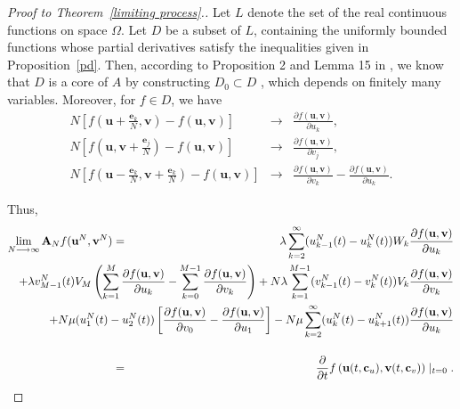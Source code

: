 \documentclass[12pt]{article}
\begin{document}
\begin{proof}[\textit{Proof to Theorem~\ref{limiting process}.}]
 Let $L$ denote the set of the real continuous functions on space $\Omega$. Let $D$ be a subset of $L$, containing the uniformly bounded functions whose partial derivatives satisfy the inequalities given in Proposition~\ref{pd}. Then, according to Proposition 2 and Lemma 15 in \cite{VD}, we know that $D$ is a core of $A$ by constructing $D_0\subset D$ , which depends on finitely many variables.
 Moreover, for $f\in D$, we have
\begin{eqnarray*}
  N \displaystyle\left[f\displaystyle(\textbf{u}+\frac{\textbf{e}_{k}}{N},\textbf{v})-f(\textbf{u},\textbf{v})\right]&\longrightarrow& \frac{\partial f(\textbf{u},\textbf{v})}{\partial u_k},\\
  N\displaystyle\left[f\displaystyle(\textbf{u},\textbf{v}+\frac{\textbf{e}_{j}}{N})-f(\textbf{u},\textbf{v})\right] &\longrightarrow&  \frac{\partial f(\textbf{u},\textbf{v})}{\partial v_j},\\
  N\left[f\displaystyle(\textbf{u}-\frac{\textbf{e}_{k}}{N},\textbf{v}+\frac{\textbf{e}_{k}}{N})-
   f(\textbf{u},\textbf{v})\right]&\longrightarrow&\frac{\partial f(\textbf{u},\textbf{v})}{\partial v_k}-\frac{\partial f(\textbf{u},\textbf{v})}{\partial u_k}.
\end{eqnarray*}

Thus,
\begin{eqnarray}\label{An}
 \nonumber \lim\limits_{N\longrightarrow\infty}\textbf{A}_{N}f(\textbf{u}^N,\textbf{v}^N)&=&\lambda\sum\limits_{k=2}\limits^{\infty}(u_{k-1}^{N}(t)-u_{k}^{N}(t)) W_{k}\displaystyle\frac{\partial f(\textbf{u},\textbf{v})}{\partial u_k}\\
  \nonumber &&\hspace*{-3.6cm} + \lambda v_{M-1}^{N}(t) V_{M}\displaystyle\left(\sum\limits_{k=1}\limits^{M}\frac{\partial f(\textbf{u},\textbf{v})}{\partial u_k}-\sum\limits_{k=0}\limits^{M-1}\frac{\partial f(\textbf{u},\textbf{v})}{\partial v_k}\right)
  + N\lambda\sum\limits_{k=1}\limits^{M-1}(v_{k-1}^{N}(t)-v_{k}^{N}(t)) V_{k} \displaystyle\frac{\partial f(\textbf{u},\textbf{v})}{\partial v_k}\\
  \nonumber &&\hspace*{-3.6cm} + N\mu(u_{1}^{N}(t)-u_{2}^{N}(t))\left[\frac{\partial f(\textbf{u},\textbf{v})}{\partial v_0}-\frac{\partial f(\textbf{u},\textbf{v})}{\partial u_1}\right]
   - N\mu\sum\limits_{k=2}\limits^{\infty}(u_{k}^{N}(t)-u_{k+1}^{N}(t))\frac{\partial f(\textbf{u},\textbf{v})}{\partial u_k}\\[4mm]
&=&\displaystyle\frac{\partial}{\partial t}f\left(\textbf{u}(t,\textbf{c}_u),\textbf{v}(t,\textbf{c}_v)\right)\mid_{t=0}.
\end{eqnarray}


\end{proof}
\end{document}

